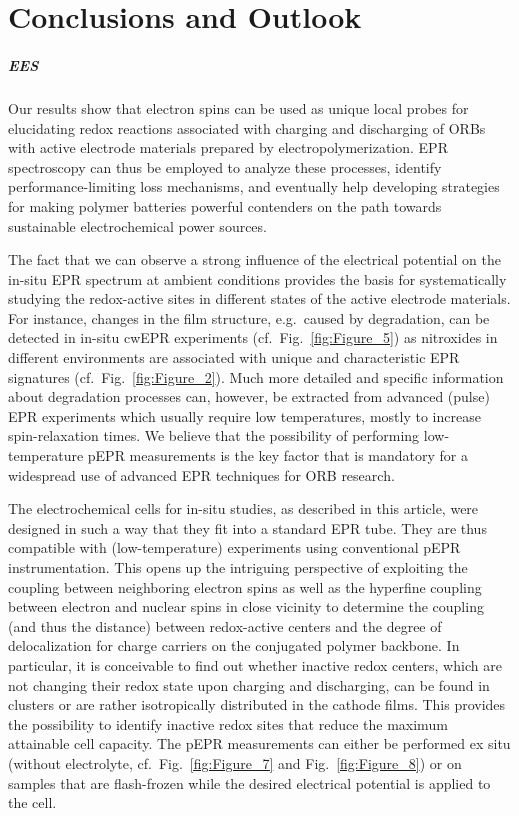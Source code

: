 \chapter{Conclusions and Outlook}
\label{ch:conclusions}
\paragraph{EES}
%
Our results show that electron spins can be used as unique local probes for elucidating redox reactions associated with charging and discharging of ORBs with active electrode materials prepared by electropolymerization. EPR spectroscopy can thus be employed to analyze these processes, identify performance-limiting loss mechanisms, and eventually help developing strategies for making polymer batteries powerful contenders on the path towards sustainable electrochemical power sources. 

\par
The fact that we can observe a strong influence of the electrical potential on the in-situ EPR spectrum at ambient conditions provides the basis for systematically studying the redox-active sites in different states of the active electrode materials. For instance, changes in the film structure, e.g.\ caused by degradation, can be detected in in-situ cwEPR experiments (cf.\ Fig.~\ref{fig:Figure_5}) as nitroxides in different environments are associated with unique and characteristic EPR signatures (cf.\ Fig.~\ref{fig:Figure_2}). Much more detailed and specific information about degradation processes can, however, be extracted from advanced (pulse) EPR experiments which usually require low temperatures, mostly to increase spin-relaxation times. We believe that the possibility of performing low-temperature pEPR measurements is the key factor that is mandatory for a widespread use of advanced EPR techniques for ORB research.

\par
The electrochemical cells for in-situ studies, as described in this article, were designed in such a way that they fit into a standard EPR tube. They are thus compatible with (low-temperature) experiments using conventional pEPR instrumentation. This opens up the intriguing perspective of exploiting the coupling between neighboring electron spins as well as the hyperfine coupling between electron and nuclear spins in close vicinity to determine the coupling (and thus the distance) between redox-active centers and the degree of delocalization for charge carriers on the conjugated polymer backbone. In particular, it is conceivable to find out whether inactive redox centers, which are not changing their redox state upon charging and discharging, can be found in clusters or are rather isotropically distributed in the cathode films. This provides the possibility to identify inactive redox sites that reduce the maximum attainable cell capacity. The pEPR measurements can either be performed ex situ (without electrolyte, cf.\ Fig.~\ref{fig:Figure_7} and Fig.~\ref{fig:Figure_8}) or on samples that are flash-frozen while the desired electrical potential is applied to the cell.

